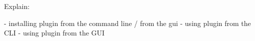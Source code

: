 
Explain:

- installing plugin from the command line / from the gui
- using plugin from the CLI
- using plugin from the GUI